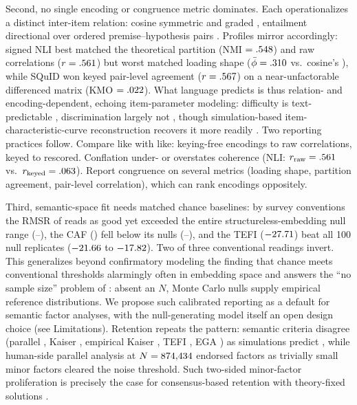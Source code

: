 Second, no single encoding or congruence metric dominates. Each
operationalizes a distinct inter-item relation: cosine symmetric and
graded \citep{reimers-gurevych-2019}, entailment directional over ordered
premise--hypothesis pairs \citep{bowman-etal-2015}. Profiles mirror
accordingly: signed NLI best matched the theoretical partition
(NMI $= .548$) and raw correlations ($r = .561$) but worst matched loading
shape ($\bar{\phi} = .310$ vs.\ cosine's \valPhiMean), while SQuID won keyed
pair-level agreement ($r = .567$) on a near-unfactorable differenced
matrix (KMO $= .022$). What language predicts is thus relation- and
encoding-dependent, echoing item-parameter modeling: difficulty is
text-predictable \citep{peters-etal-2025}, discrimination largely not
\citep{han-etal-2025}, though simulation-based item-characteristic-curve
reconstruction recovers it more readily \citep{ormerod-2026}. Two
reporting practices follow. Compare like with like: keying-free encodings
to raw correlations, keyed to rescored. Conflation under- or overstates
coherence (NLI: $r_{\text{raw}} = .561$ vs.\
$r_{\text{keyed}} = .063$). Report congruence on several metrics
(loading shape, partition agreement, pair-level correlation), which can
rank encodings oppositely.

Third, semantic-space fit needs matched chance baselines: by survey
conventions the RMSR of \valRmsr{} reads as good yet exceeded the entire
structureless-embedding null range (\valCalRmsrMin--\valCalRmsrMax), the CAF (\valCaf) fell
below its nulls (\valCalCafMin--\valCalCafMax), and the TEFI ($-27.71$) beat all 100 null
replicates ($-21.66$ to $-17.82$). Two of three conventional readings
invert. This generalizes beyond confirmatory modeling the finding that
chance meets conventional thresholds alarmingly often in embedding space
\citep{pokropek-2026} and answers the ``no sample size'' problem of
\citet{suarez-alvarez-etal-2026}: absent an $N$, Monte Carlo nulls supply
empirical reference distributions. We propose such calibrated reporting as
a default for semantic factor analyses, with the null-generating model
itself an open design choice (see Limitations). Retention repeats the pattern:
semantic criteria disagree (parallel \valPaK, Kaiser \valKaiserK, empirical Kaiser \valEkcK, TEFI \valTefiK, EGA \valEgaK) as
simulations predict \citep{garrido-etal-2025, golino-2026}, while
human-side parallel analysis at $N = 874{,}434$ endorsed \valHumanPaKWord{} factors as
trivially small minor factors cleared the noise threshold. Such two-sided
minor-factor proliferation is precisely the case for consensus-based
retention with theory-fixed solutions \citep{goldberg-1990}.
